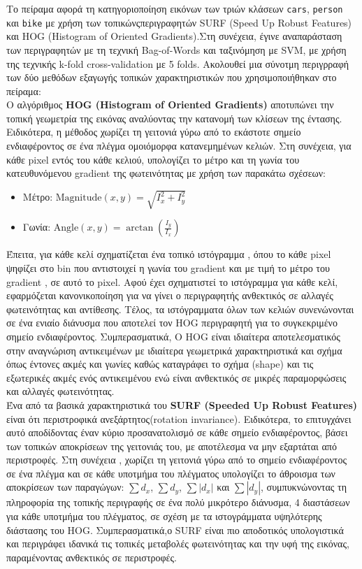 \documentclass[12pt, a4paper]{article}
\begin{document}
 Το πείραμα αφορά τη
κατηγοριοποίηση εικόνων των τριών κλάσεων \texttt{cars}, \texttt{person} και
\texttt{bike} με χρήση των τοπικώνςπεριγραφητών SURF (Speed Up Robust Features)
και HOG (Histogram of Oriented Gradients).Στη συνέχεια, έγινε αναπαράσταση των περιγραφητών με τη τεχνική Bag-of-Words και ταξινόμηση με 
SVM, με χρήση της τεχνικής k-fold cross-validation με 5 folds.
Ακολουθεί μια σύνοτμη περιγρραφή των δύο μεθόδων εξαγωγής τοπικών χαρακτηριστικών που χρησιμοποιήθηκαν στο πείραμα:\\
Ο αλγόριθμος \textbf{HOG (Histogram of Oriented Gradients)} αποτυπώνει την τοπική γεωμετρία της εικόνας αναλύοντας την κατανομή των κλίσεων της έντασης.
Ειδικότερα, η μέθοδος χωρίζει τη γειτονιά γύρω από το εκάστοτε σημείο ενδιαφέροντος σε ένα πλέγμα ομοιόμορφα κατανεμημένων κελιών. Στη συνέχεια, για κάθε pixel εντός του κάθε κελιού,
υπολογίζει το μέτρο και τη γωνία του κατευθυνόμενου gradient της φωτεινότητας με χρήση των παρακάτω σχέσεων:
\begin{itemize}
    \item Μέτρο: $\displaystyle \mathrm{Magnitude}(x,y) = \sqrt{I_x^2 + I_y^2}$
    
    \vspace{0.3cm}
    
    \item Γωνία: $\displaystyle \mathrm{Angle}(x,y) = \arctan\!\left(\frac{I_y}{I_x}\right)$
\end{itemize}
Έπειτα, για κάθε κελί σχηματίζεται ένα τοπικό ιστόγραμμα , όπου το κάθε pixel ψηφίζει στο bin που αντιστοιχεί η γωνία του gradient και με τιμή το μέτρο του gradient , σε αυτό το pixel. Αφού έχει σχηματιστεί το ιστόγραμμα για κάθε κελί, εφαρμόζεται κανονικοποίηση για να γίνει ο περιγραφητής ανθεκτικός σε αλλαγές φωτεινότητας και αντίθεσης. Τέλος, τα ιστόγραμματα όλων των κελιών συνενώνονται σε ένα ενιαίο διάνυσμα που αποτελεί τον HOG περιγραφητή για το συγκεκριμένο σημείο ενδιαφέροντος.
Συμπερασματικά, Ο HOG είναι ιδιαίτερα αποτελεσματικός στην αναγνώριση αντικειμένων με ιδιαίτερα γεωμετρικά χαρακτηριστικά και σχήμα όπως έντονες ακμές και γωνίες καθώς καταγράφει το σχήμα (shape) και τις εξωτερικές ακμές ενός αντικειμένου ενώ είναι ανθεκτικός σε μικρές παραμορφώσεις και αλλαγές φωτεινότητας.\\

Ένα από τα βασικά χαρακτηριστικά του \textbf{SURF (Speeded Up Robust Features)} είναι ότι περιστροφικά ανεξάρτητος(rotation invariance). Ειδικότερα, το επιτυγχάνει αυτό αποδίδοντας έναν κύριο προσανατολισμό σε κάθε σημείο ενδιαφέροντος, βάσει των τοπικών αποκρίσεων της γειτονιάς του, με αποτέλεσμα να μην εξαρτάται από περιστροφές.
Στη συνέχεια , χωρίζει τη γειτονιά γύρω από το σημείο ενδιαφέροντος σε ένα πλέγμα και σε κάθε υποτμήμα του πλέγματος υπολογίζει το άθροισμα των αποκρίσεων των παραγώγων: $\sum d_x$, $\sum d_y$, $\sum |d_x|$ και $\sum |d_y|$, συμπυκνώνοντας τη πληροφορία της τοπικής περιγραφής σε ένα πολύ μικρότερο διάνυσμα, 4 διαστάσεων για κάθε υποτμήμα του πλέγματος, σε σχέση με τα ιστογράμματα υψηλότερης διάστασης του HOG.
Συμπερασματικά,ο SURF είναι πιο αποδοτικός υπολογιστικά και περιγράφει ιδανικά τις τοπικές μεταβολές φωτεινότητας και την υφή της εικόνας, παραμένοντας ανθεκτικός σε περιστροφές.
\end{document}
